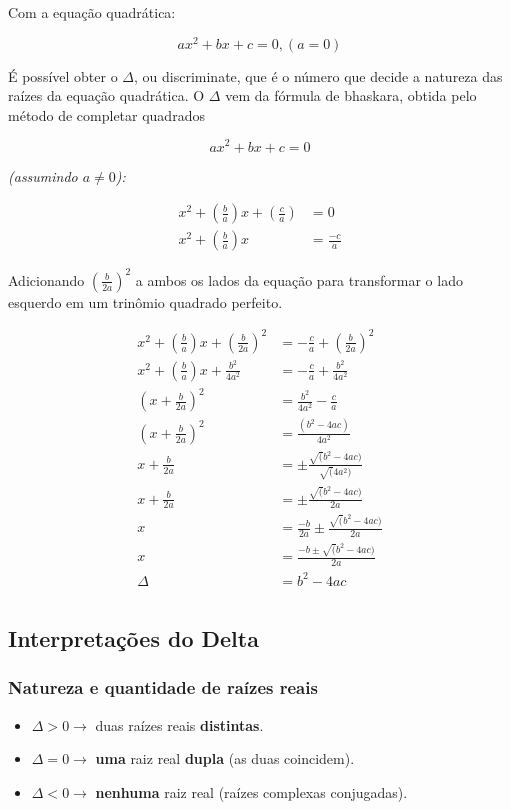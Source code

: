 \documentclass[../resumo.tex]{subfiles}
\begin{document}
	Com a equação quadrática:

	\[ ax^2 + bx + c = 0, (a = 0) \]

	É possível obter o $\Delta$, ou discriminate, que é o número que decide a natureza das raízes da equação quadrática.
	O $\Delta$ vem da fórmula de bhaskara, obtida pelo método de completar quadrados 

	\[ ax^2 + bx + c = 0 \]

	\textit{(assumindo $a \neq 0$):}

	\begin{align*}
		x^2 + (\frac{b}{a})x + (\frac{c}{a}) &= 0 \\
		x^2 + (\frac{b}{a})x &= \frac{-c}{a}
	\end{align*}

	Adicionando $(\frac{b}{2a})^2$ a ambos os lados da equação para transformar o lado esquerdo em um trinômio quadrado perfeito.

	\begin{align*}
		x^2 + (\frac{b}{a})x + (\frac{b}{2a})^2 &= -\frac{c}{a} + (\frac{b}{2a})^2 \\
		x^2 + (\frac{b}{a})x + \frac{b^2}{4a^2} &= -\frac{c}{a} + \frac{b^2}{4a^2} \\
		(x + \frac{b}{2a})^2 &= \frac{b^2}{4a^2} - \frac{c}{a} \\
		(x + \frac{b}{2a})^2 &= \frac{(b^2 - 4ac)}{4a^2} \\
		x + \frac{b}{2a} &= \pm\frac{\surd(b^2 - 4ac)}{\surd(4a^2)} \\
		x + \frac{b}{2a} &= \pm\frac{\surd(b^2 - 4ac)}{2a} \\
		x &= \frac{-b}{2a} \pm \frac{\surd(b^2 - 4ac)}{2a} \\
		x &= \frac{-b \pm \surd(b^2 - 4ac)}{2a} \\
		\Delta &= b^2 - 4ac \\
	\end{align*}

	\subsection{Interpretações do Delta}

	\subsubsection{Natureza e quantidade de raízes reais}
	
	\begin{itemize}
		\item $\Delta > 0 \to$ duas raízes reais \textbf{distintas}.
		\item $\Delta = 0 \rightarrow$ \textbf{uma} raiz real \textbf{dupla} (as duas coincidem).
		\item $\Delta < 0 \rightarrow$ \textbf{nenhuma} raiz real (raízes complexas conjugadas).
	\end{itemize}
\end{document}
